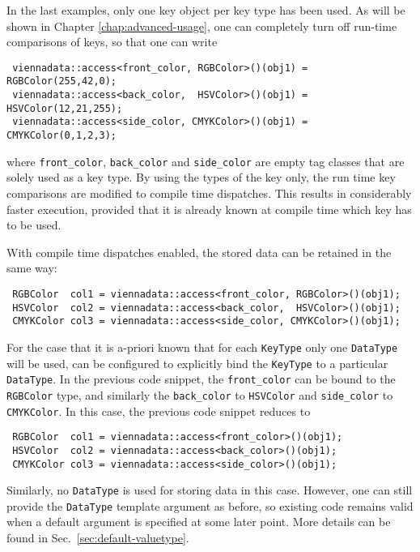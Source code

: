 In the last examples, only one key object per key type has been used. As will be shown in 
Chapter \ref{chap:advanced-usage}, one can completely turn off run-time comparisons of keys,
so that one can write
\begin{lstlisting}
 viennadata::access<front_color, RGBColor>()(obj1) = RGBColor(255,42,0);
 viennadata::access<back_color,  HSVColor>()(obj1) = HSVColor(12,21,255);
 viennadata::access<side_color, CMYKColor>()(obj1) = CMYKColor(0,1,2,3);
\end{lstlisting}
where \lstinline|front_color|, \lstinline|back_color| and \lstinline|side_color| are empty tag classes \cite{Alexandrescu:ModernCpp,Vandevoorde:CppTemplates} that are solely used as a key type.
By using the types of the key only, the run time key comparisons are modified to compile time dispatches. This results in considerably faster
execution, provided that it is already known at compile time which key has to be used.


With compile time dispatches enabled, the stored data can be retained in the same way:
\begin{lstlisting}
 RGBColor  col1 = viennadata::access<front_color, RGBColor>()(obj1);
 HSVColor  col2 = viennadata::access<back_color,  HSVColor>()(obj1);
 CMYKColor col3 = viennadata::access<side_color, CMYKColor>()(obj1);
\end{lstlisting}
For the case that it is a-priori known that for each \lstinline|KeyType| only one \lstinline|DataType| will be used, {\ViennaData}
can be configured to explicitly bind the \lstinline|KeyType| to a particular \lstinline|DataType|. In the previous code snippet,
the \lstinline|front_color| can be bound to the \lstinline|RGBColor| type, and similarly the \lstinline|back_color| to \lstinline|HSVColor|
and \lstinline|side_color| to \lstinline|CMYKColor|. In this case, the previous code snippet reduces to
\begin{lstlisting}
 RGBColor  col1 = viennadata::access<front_color>()(obj1);
 HSVColor  col2 = viennadata::access<back_color>()(obj1);
 CMYKColor col3 = viennadata::access<side_color>()(obj1);
\end{lstlisting}
Similarly, no \lstinline|DataType| is used for storing data in this case. However, one can still provide the \lstinline|DataType| template argument
as before, so existing code remains valid when a default argument is specified at some later point. More details can be found in Sec.~\ref{sec:default-valuetype}.


